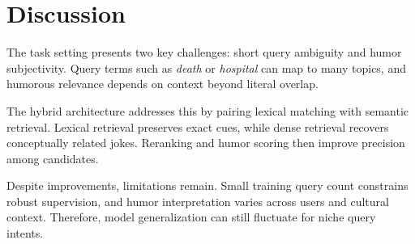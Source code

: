 \chapter{Discussion}
\justify

The task setting presents two key challenges: short query ambiguity and humor subjectivity. Query terms such as \textit{death} or \textit{hospital} can map to many topics, and humorous relevance depends on context beyond literal overlap.

The hybrid architecture addresses this by pairing lexical matching with semantic retrieval. Lexical retrieval preserves exact cues, while dense retrieval recovers conceptually related jokes. Reranking and humor scoring then improve precision among candidates.

Despite improvements, limitations remain. Small training query count constrains robust supervision, and humor interpretation varies across users and cultural context. Therefore, model generalization can still fluctuate for niche query intents.
